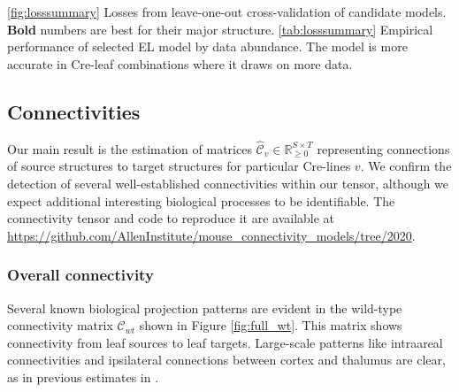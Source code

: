 \begin{table}[H]
{\label{tab:crossvalidation}
}
\caption{\ref{fig:losssummary} Losses from leave-one-out cross-validation of candidate models.
\textbf{Bold} numbers are best for their major structure.
\ref{tab:losssummary} Empirical performance of selected EL model by data abundance.
The model is more accurate in Cre-leaf combinations where it draws on more data.}
\end{table}

\subsection{Connectivities}

Our main result is the estimation of matrices $\hat {\mathcal C}_v \in \mathbb R_{\geq 0}^{S \times T}$ representing connections of source structures to target structures for particular Cre-lines $v$. 
We confirm the detection of several well-established connectivities within our tensor, although we expect additional interesting biological processes to be identifiable.
The connectivity tensor and code to reproduce it are available at \url{https://github.com/AllenInstitute/mouse_connectivity_models/tree/2020}.

\subsubsection{Overall connectivity}

Several known biological projection patterns are evident in the wild-type connectivity matrix $\mathcal C_{wt}$ shown in Figure \ref{fig:full_wt}.
This matrix shows connectivity from leaf sources to leaf targets.
Large-scale patterns like intraareal connectivities and ipsilateral connections between cortex and thalumus are clear, as in previous estimates in \citet{Oh2014-kh, Knox2019-ot, Harris2019-mr}.

